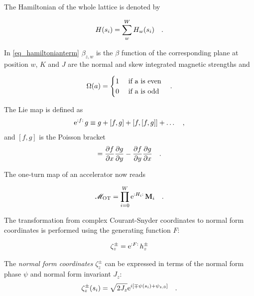 The Hamiltonian of the whole lattice is denoted by

\begin{equation}
    H(s_i) = \sum\limits_w^W H_w(s_i)
    \quad .
\end{equation}

In \eqref{eq_hamiltonianterm} $\beta_{z,w}$ is the $\beta$ function of the corresponding plane at position $w$,
$K$ and $J$ are the normal and skew integrated magnetic strengths and 

\begin{equation}
    \Omega(a) = 
    \begin{cases}
        1 &\text{ if a is even} \\
        0 &\text{ if a is odd} \\
    \end{cases}
    \quad .
\end{equation}


The Lie map is defined as
\begin{equation}
    \text{e}^{{:}f{:}\,}g \equiv g + [f,g] + [f, [f,g]] + \ldots
    \quad ,
    \label{eq_liemap}
\end{equation}
and $[f,g]$ is the Poisson bracket
\begin{equation}
    [f,g] = 
    \frac{\partial f}{\partial x} \frac{\partial g}{\partial y}
    - \frac{\partial f}{\partial y}\frac{\partial g}{\partial x}
    \fstop
\end{equation}

The one-turn map of an accelerator now reads

\begin{equation}
    \mathscr{M}_\text{OT} = \prod\limits_{i=0}^W \text{e}^{{:}H_i{:}\,} \mathbf{M}_i
    \quad .
\end{equation}

The transformation from complex Courant-Snyder coordinates to normal form coordinates is performed
using the generating function $F$:

\begin{equation}
    \zeta_z^\pm = \text{e}^{{:}F{:}\,} h_z^\pm
    \label{eq_hfromz}
\end{equation}

The \emph{normal form coordinates} $\zeta_z^\pm$ can be expressed in terms of the normal form phase $\psi$
and normal form invariant $J_z$:
\begin{equation}
    \zeta_z^\pm(s_i) = \sqrt{2J_z}\text{e}^{i\left[\mp \psi(s_i) + \psi_{z,0} \right]}
    \quad .
\end{equation}


